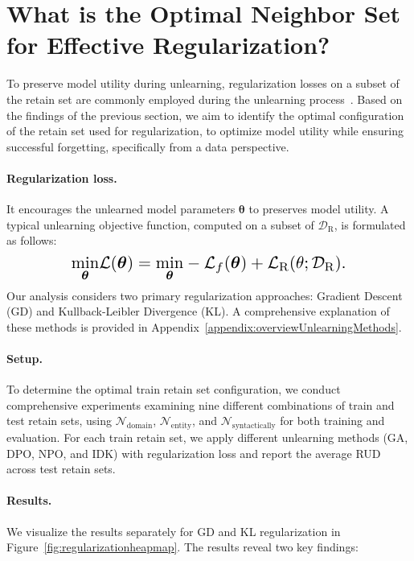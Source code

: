 \section{What is the Optimal Neighbor Set for Effective Regularization?}
\label{sec:solution}
To preserve model utility during unlearning, regularization losses on a subset of the retain set are commonly employed during the unlearning process~\cite{closerlookat,maini2024tofu}. Based on the findings of the previous section, we aim to identify the optimal configuration of the retain set used for regularization, to optimize model utility while ensuring successful forgetting, specifically from a data perspective.

\paragraph{Regularization loss.} It encourages the unlearned model parameters $\bm \theta$ to preserves model utility. A typical unlearning objective function, computed on a subset of $\mathcal{D}_{\text{R}}$, is formulated as follows:
\begin{equation}
    \resizebox{0.71\hsize}{!}{$
    \underset{\bm \theta}{\min} \mathcal{L}(\bm \theta) = \underset{\bm \theta}{\min} - \mathcal{L}_f(\bm \theta) +  \mathcal{L}_{\text{R}}(\theta;\mathcal{D}_{\text{R}}).$}
    \label{eq:previous_objective}
\end{equation}
Our analysis considers two primary regularization approaches: Gradient Descent (GD) and Kullback-Leibler Divergence (KL). A comprehensive explanation of these methods is provided in Appendix~\ref{appendix:overviewUnlearningMethods}.
\paragraph{Setup.} To determine the optimal train retain set configuration, we conduct comprehensive experiments examining nine different combinations of train and test retain sets, using $\mathcal{N}_{\text{domain}}$, $\mathcal{N}_{\text{entity}}$, and $\mathcal{N}_{\text{syntactically}}$ for both training and evaluation. For each train retain set, we apply different unlearning methods (GA, DPO, NPO, and IDK) with regularization loss and report the average RUD across test retain sets.

\paragraph{Results.} We visualize the results separately for GD and KL regularization in Figure~\ref{fig:regularizationheapmap}. The results reveal two key findings:

